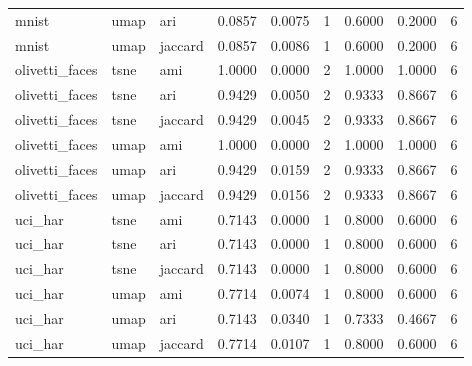 \begin{tabular}{lllrrrrrr}
mnist & umap & ari & 0.0857 & 0.0075 & 1 & 0.6000 & 0.2000 & 6 \\
mnist & umap & jaccard & 0.0857 & 0.0086 & 1 & 0.6000 & 0.2000 & 6 \\
olivetti_faces & tsne & ami & 1.0000 & 0.0000 & 2 & 1.0000 & 1.0000 & 6 \\
olivetti_faces & tsne & ari & 0.9429 & 0.0050 & 2 & 0.9333 & 0.8667 & 6 \\
olivetti_faces & tsne & jaccard & 0.9429 & 0.0045 & 2 & 0.9333 & 0.8667 & 6 \\
olivetti_faces & umap & ami & 1.0000 & 0.0000 & 2 & 1.0000 & 1.0000 & 6 \\
olivetti_faces & umap & ari & 0.9429 & 0.0159 & 2 & 0.9333 & 0.8667 & 6 \\
olivetti_faces & umap & jaccard & 0.9429 & 0.0156 & 2 & 0.9333 & 0.8667 & 6 \\
uci_har & tsne & ami & 0.7143 & 0.0000 & 1 & 0.8000 & 0.6000 & 6 \\
uci_har & tsne & ari & 0.7143 & 0.0000 & 1 & 0.8000 & 0.6000 & 6 \\
uci_har & tsne & jaccard & 0.7143 & 0.0000 & 1 & 0.8000 & 0.6000 & 6 \\
uci_har & umap & ami & 0.7714 & 0.0074 & 1 & 0.8000 & 0.6000 & 6 \\
uci_har & umap & ari & 0.7143 & 0.0340 & 1 & 0.7333 & 0.4667 & 6 \\
uci_har & umap & jaccard & 0.7714 & 0.0107 & 1 & 0.8000 & 0.6000 & 6 \\
\bottomrule
\end{tabular}

